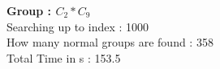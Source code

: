 \textbf{Group : $C_2*C_9$}\\
Searching up to index : 1000\\
How many normal groups are found : 358\\
Total Time in s : 153.5\\
